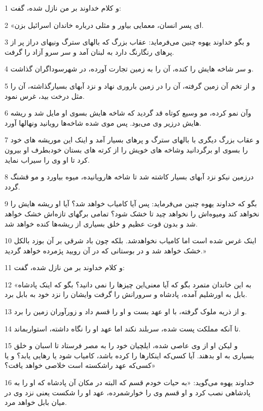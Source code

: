 \par 1 و کلام خداوند بر من نازل شده، گفت:
\par 2 «ای پسر انسان، معمایی بیاور و مثلی درباره خاندان اسرائیل بزن.
\par 3 و بگو خداوند یهوه چنین می‌فرماید: عقاب بزرگ که بالهای سترگ ونیهای دراز پر از پرهای رنگارنگ دارد به لبنان آمد و سر سرو آزاد را گرفت.
\par 4 و سر شاخه هایش را کنده، آن را به زمین تجارت آورده، در شهرسوداگران گذاشت.
\par 5 و از تخم آن زمین گرفته، آن را در زمین باروری نهاد و نزد آبهای بسیارگذاشته، آن را مثل درخت بید، غرس نمود.
\par 6 وآن نمو کرده، مو وسیع کوتاه قد گردید که شاخه هایش بسوی او مایل شد و ریشه هایش درزیر وی می‌بود. پس موی شده شاخه‌ها رویانید ونهالها آورد.
\par 7 و عقاب بزرگ دیگری با بالهای سترگ و پرهای بسیار آمد و اینک این موریشه های خود را بسوی او برگردانید وشاخه های خویش را از کرته های بستان خودبطرف او بیرون کرد تا او وی را سیراب نماید.
\par 8 درزمین نیکو نزد آبهای بسیار کاشته شد تا شاخه هارویانیده، میوه بیاورد و مو قشنگ گردد.
\par 9 بگو که خداوند یهوه چنین می‌فرماید: پس آیا کامیاب خواهد شد؟ آیا او ریشه هایش را نخواهد کند ومیوه‌اش را نخواهد چید تا خشک شود؟ تمامی برگهای تازه‌اش خشک خواهد شد و بدون قوت عظیم و خلق بسیاری از ریشه‌ها کنده خواهد شد.
\par 10 اینک غرس شده است اما کامیاب نخواهدشد. بلکه چون باد شرقی بر آن بوزد بالکل خشک خواهد شد و در بوستانی که در آن رویید پژمرده خواهد گردید.»
\par 11 و کلام خداوند بر من نازل شده، گفت:
\par 12 «به این خاندان متمرد بگو که آیا معنی‌این چیزها را نمی دانید؟ بگو که اینک پادشاه بابل به اورشلیم آمده، پادشاه و سرورانش را گرفت وایشان را نزد خود به بابل برد.
\par 13 و از ذریه ملوک گرفته، با او عهد بست و او را قسم داد و زورآوران زمین را برد.
\par 14 تا آنکه مملکت پست شده، سربلند نکند اما عهد او را نگاه داشته، استواربماند.
\par 15 و لیکن او از وی عاصی شده، ایلچیان خود را به مصر فرستاد تا اسبان و خلق بسیاری به او بدهند. آیا کسی‌که اینکارها را کرده باشد، کامیاب شود یا رهایی یابد؟ و یا کسی‌که عهد راشکسته است خلاصی خواهد یافت؟»
\par 16 خداوند یهوه می‌گوید: «به حیات خودم قسم که البته در مکان آن پادشاه که او را به پادشاهی نصب کرد و او قسم وی را خوارشمرده، عهد او را شکست یعنی نزد وی در میان بابل خواهد مرد.
